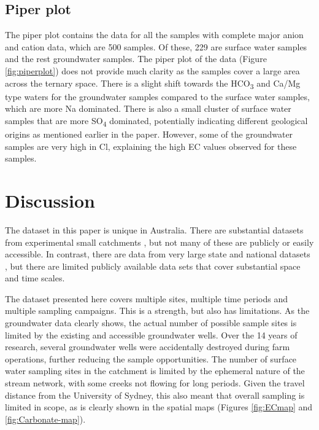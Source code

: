 \documentclass[, manuscript]{copernicus}
\begin{document}
\subsection{Piper plot}

The piper plot contains the data for all the samples with complete major
anion and cation data, which are 500 samples. Of these, 229 are surface
water samples and the rest groundwater samples. The piper plot of the
data (Figure \ref{fig:piperplot}) does not provide much clarity as the
samples cover a large area across the ternary space. There is a slight
shift towards the HCO\textsubscript{3} and Ca/Mg type waters for the
groundwater samples compared to the surface water samples, which are
more Na dominated. There is also a small cluster of surface water
samples that are more SO\textsubscript{4} dominated, potentially
indicating different geological origins as mentioned earlier in the
paper. However, some of the groundwater samples are very high in Cl,
explaining the high EC values observed for these samples.

\section{Discussion}

The dataset in this paper is unique in Australia. There are substantial
datasets from experimental small catchments
\citep[i.e.][]{Hughes2007, Summerell2006}, but not many of these are
publicly or easily accessible. In contrast, there are data from very
large state and national datasets \citep[i.e.][]{Jolly2001}, but there
are limited publicly available data sets that cover substantial space
and time scales.

The dataset presented here covers multiple sites, multiple time periods
and multiple sampling campaigns. This is a strength, but also has
limitations. As the groundwater data clearly shows, the actual number of
possible sample sites is limited by the existing and accessible
groundwater wells. Over the 14 years of research, several groundwater
wells were accidentally destroyed during farm operations, further
reducing the sample opportunities. The number of surface water sampling
sites in the catchment is limited by the ephemeral nature of the stream
network, with some creeks not flowing for long periods. Given the travel
distance from the University of Sydney, this also meant that overall
sampling is limited in scope, as is clearly shown in the spatial maps
(Figures \ref{fig:ECmap} and \ref{fig:Carbonate-map}).
\end{document}
